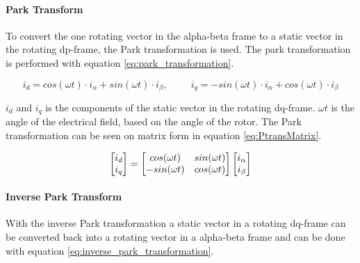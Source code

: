 \paragraph{Park Transform}
To convert the one rotating vector in the alpha-beta frame to a static vector in the rotating dp-frame, the Park transformation is used. The park transformation is performed with equation \ref{eq:park_transformation}.

\begin{equation}
    i_{d} = cos(\omega t) \cdot i_{\alpha} + sin(\omega t) \cdot i_{\beta}
    , \hspace{1cm}
    i_{q} = -sin(\omega t) \cdot i_{\alpha} + cos(\omega t) \cdot i_{\beta}
    \label{eq:park_transformation}
\end{equation}

$i_d$ and $i_q$ is the components of the static vector in the rotating dq-frame. $\omega t$ is the angle of the electrical field, based on the angle of the rotor.
The Park transformation can be seen on matrix form in equation \ref{eq:PtransMatrix}.


\begin{equation}
    \centering
    \begin{bmatrix}
        i_{d} \\ 
        i_{q}
    \end{bmatrix}
    =
    \begin{bmatrix}
       cos(\omega t) & sin(\omega t) \\
       -sin(\omega t) & cos(\omega t)
    \end{bmatrix}
    \begin{bmatrix}
        i_{\alpha} \\ 
        i_{\beta}
    \end{bmatrix}
    \label{eq:PtransMatrix}
\end{equation}





\paragraph{Inverse Park Transform}
With the inverse Park transformation a static vector in a rotating dq-frame can be converted back into a rotating vector in a alpha-beta frame and can be done with equation \ref{eq:inverse_park_transformation}.


